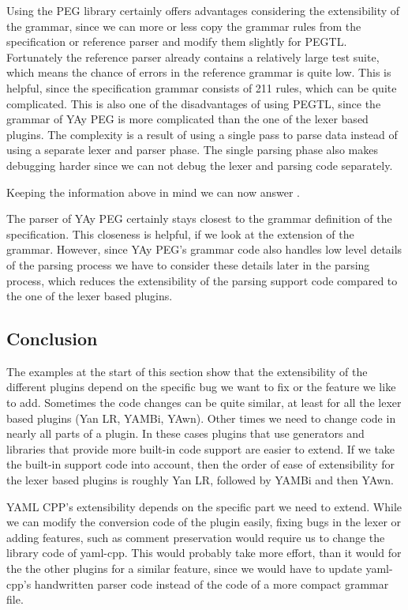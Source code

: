 Using the PEG library certainly offers advantages considering the extensibility of the grammar, since we can more or less copy the grammar rules from the specification or reference parser and modify them slightly for \gls{PEGTL}. Fortunately the reference parser already contains a relatively large test suite, which means the chance of errors in the reference grammar is quite low. This is helpful, since the specification grammar consists of 211 rules, which can be quite complicated. This is also one of the disadvantages of using \gls{PEGTL}, since the grammar of YAy PEG is more complicated than the one of the lexer based plugins. The complexity is a result of using a single pass to parse  data instead of using a separate lexer and parser phase. The single parsing phase also makes debugging harder since we can not debug the lexer and parsing code separately.

Keeping the information above in mind we can now answer .

  \closeness*

The parser of YAy PEG certainly stays closest to the grammar definition of the  specification. This closeness is helpful, if we look at the extension of the grammar. However, since YAy PEG’s grammar code also handles low level details of the parsing process we have to consider these details later in the parsing process, which reduces the extensibility of the parsing support code compared to the one of the lexer based plugins.

\subsection{Conclusion}

The examples at the start of this section show that the extensibility of the different  plugins depend on the specific bug we want to fix or the feature we like to add. Sometimes the code changes can be quite similar, at least for all the lexer based plugins (Yan LR, YAMBi, YAwn). Other times we need to change code in nearly all parts of a plugin. In these cases plugins that use generators and libraries that provide more built-in code support are easier to extend. If we take the built-in support code into account, then the order of ease of extensibility for the lexer based plugins is roughly Yan LR, followed by YAMBi and then YAwn.

YAML CPP’s extensibility depends on the specific part we need to extend. While we can modify the conversion code of the plugin easily, fixing bugs in the lexer or adding features, such as comment preservation would require us to change the library code of yaml-cpp. This would probably take more effort, than it would for the the other  plugins for a similar feature, since we would have to update yaml-cpp’s handwritten parser code instead of the code of a more compact grammar file.

